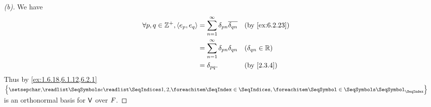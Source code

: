 \begin{proof}[(b)]
  We have
  \begin{align*}
    \forall p, q \in \Z^+, \inn{e_p, e_q} & = \sum_{n = 1}^\infty \delta_{p n} \conj{\delta_{q n}} &  & \text{(by \cref{ex:6.2.23})} \\
                                          & = \sum_{n = 1}^\infty \delta_{p n} \delta_{q n}        &  & (\delta_{q n} \in \R)        \\
                                          & = \delta_{p q}.                                        &  & \text{(by \cref{2.3.4})}
  \end{align*}
  Thus by \cref{ex:1.6.18,6.1.12,6.2.1} \(\set{\seq{e}{1,2,}}\) is an orthonormal basis for \(\mathsf{V}\) over \(\mathit{F}\).
\end{proof}

